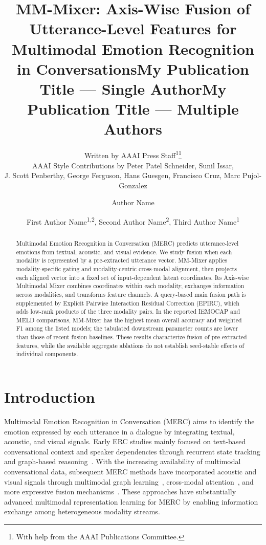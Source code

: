 \documentclass[letterpaper]{article} %
\title{MM-Mixer: Axis-Wise Fusion of Utterance-Level Features for Multimodal Emotion Recognition in Conversations}
\author{
    Written by AAAI Press Staff\textsuperscript{\rm 1}\thanks{With help from the AAAI Publications Committee.}\\
    AAAI Style Contributions by Peter Patel Schneider,
    Sunil Issar,\\
    J. Scott Penberthy,
    George Ferguson,
    Hans Guesgen,
    Francisco Cruz\equalcontrib\corresponding,
    Marc Pujol-Gonzalez\equalcontrib\corresponding
}
\title{My Publication Title --- Single Author}
\author {
    Author Name
}
\title{My Publication Title --- Multiple Authors}
\author {
    First Author Name\textsuperscript{\rm 1,\rm 2}\equalcontrib,
    Second Author Name\textsuperscript{\rm 2}\equalcontrib,
    Third Author Name\textsuperscript{\rm 1}\corresponding
}
\begin{document}
\maketitle

\begin{abstract}
Multimodal Emotion Recognition in Conversation (MERC) predicts utterance-level emotions from textual, acoustic, and visual evidence. We study fusion when each modality is represented by a pre-extracted utterance vector. MM-Mixer applies modality-specific gating and modality-centric cross-modal alignment, then projects each aligned vector into a fixed set of input-dependent latent coordinates. Its Axis-wise Multimodal Mixer combines coordinates within each modality, exchanges information across modalities, and transforms feature channels. A query-based main fusion path is supplemented by Explicit Pairwise Interaction Residual Correction (EPIRC), which adds low-rank products of the three modality pairs. In the reported IEMOCAP and MELD comparisons, MM-Mixer has the highest mean overall accuracy and weighted F1 among the listed models; the tabulated downstream parameter counts are lower than those of recent fusion baselines. These results characterize fusion of pre-extracted features, while the available aggregate ablations do not establish seed-stable effects of individual components.

\end{abstract}

\section{Introduction}

Multimodal Emotion Recognition in Conversation (MERC) aims to identify the emotion expressed by each utterance in a dialogue by integrating textual, acoustic, and visual signals. Early ERC studies mainly focused on text-based conversational context and speaker dependencies through recurrent state tracking and graph-based reasoning~\cite{dialoguernn,dialoguegcn}. With the increasing availability of multimodal conversational data, subsequent MERC methods have incorporated acoustic and visual signals through multimodal graph learning~\cite{mmgcn}, cross-modal attention~\cite{dialoguetrm}, and more expressive fusion mechanisms~\cite{sdt,css}. These approaches have substantially advanced multimodal representation learning for MERC by enabling information exchange among heterogeneous modality streams.
\end{document}
